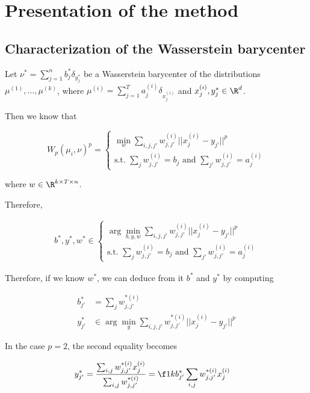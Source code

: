 \documentclass[11pt,a4paper]{article}
\begin{document}
\section{Presentation of the method}

\subsection{Characterization of the Wasserstein barycenter}

Let $\nu^* = \sum_{j=1}^n b^*_j \delta_{y^*_j}$ be a Wasserstein barycenter of the distributions $\mu^{(1)}, ..., \mu^{(k)}$, where $\mu^{(i)} = \sum_{j=1}^T a^{(i)}_j \delta_{x^{(i)}_j}$ and $x^{(i)}_j, y^*_j \in \R^d$.

Then we know that 

$$W_p(\mu_i, \nu)^p = \begin{cases}
    \underset{w}{\min} \sum_{i, j, j'} w^{(i)}_{j, j'} ||x^{(i)}_j - y_{j'}||^p \\
    \text{s.t. } \sum_j w^{(i)}_{j, j'} = b_j \text{ and } \sum_{j'} w^{(i)}_{j, j'} = a^{(i)}_j
\end{cases}$$

where $w \in \R^{k\times T \times n}$.

Therefore,

\begin{align}
    \label{eqn:discretewb}
    b^*, y^*, w^* \in 
    \begin{cases}
        \arg\min_{b, y, w} \sum_{i, j, j'} w^{(i)}_{j, j'} ||x^{(i)}_j - y_{j'}||^p \\
        \text{s.t. } \sum_j w^{(i)}_{j, j'} = b_j \text{ and } \sum_{j'} w^{(i)}_{j, j'} = a^{(i)}_j
    \end{cases}
\end{align}

Therefore, if we know $w^*$, we can deduce from it $b^*$ and $y^*$ by computing

\begin{align}
    b^*_{j'} &= \sum_j w^{*(i)}_{j, j'}  \label{eqn:b}\\
    y^*_{j'} &\in \arg \min_y \sum_{i, j, j'} w^{*(i)}_{j, j'} ||x^{(i)}_j - y_{j'}||^p \label{eqn:y}
\end{align}

In the case $p=2$, the second equality becomes

\begin{align}
    y^*_{j'} &= \frac {\sum_{i, j} w^{*(i)}_{j, j'} x^{(i)}_j} {\sum_{i, j} w^{*(i)}_{j, j'}} = \f 1 {kb^*_{j'}} \sum_{i, j} w^{*(i)}_{j, j'} x^{(i)}_j
\end{align}
\end{document}
